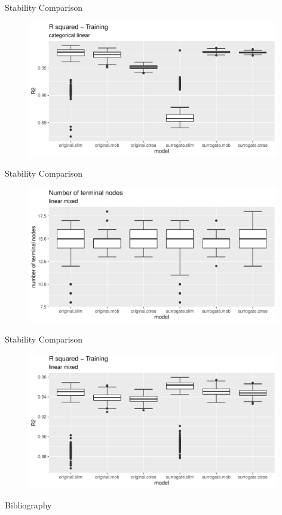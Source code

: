 \documentclass[9pt, xcolor=table]{beamer}
\begin{document}
\begin{frame}{Stability Comparison}
\begin{figure}
    \includegraphics[width=11cm]{Figures/Stability/categorical_linear/r2_train.pdf}
\end{figure}
\end{frame}

\begin{frame}{Stability Comparison}
\begin{figure}
    \includegraphics[width=11cm]{Figures/Stability/linear_mixed/nofnodes.pdf}
\end{figure}
\end{frame}

\begin{frame}{Stability Comparison}
\begin{figure}
    \includegraphics[width=11cm]{Figures/Stability/linear_mixed/r2_train.pdf}
\end{figure}
\end{frame}


\begin{frame}{Bibliography}
    
    

\end{frame}
\end{document}

